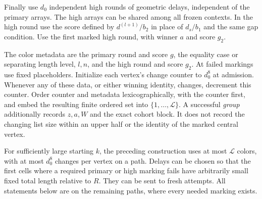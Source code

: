 Finally use $d_0$ independent high rounds of geometric delays, independent
of the primary arrays.  The high arrays can be shared among all frozen
contexts.  In the high round use the score defined by
$d^{(l+1)}/b_2$ in place of $d_s/b_1$ and the same gap condition.
Use the first marked high round, with winner $a$ and score $g_2$.

The color metadata are the primary round and score $g$, the equality
case or separating length level, $l,n$, and the high round and score
$g_2$.  At failed markings use fixed placeholders.  Initialize each vertex's change counter to $d_0^8$ at admission.
Whenever any of these data, or either winning identity, changes,
decrement this counter.  Order counter and metadata
lexicographically, with the counter first, and embed the resulting
finite ordered set into $\{1,\ldots,\mathcal L\}$.  A successful
\emph{group} additionally records $z,a,W$ and the exact cohort block.
It does not record the changing list size within an upper half or the
identity of the marked central vertex.

\begin{lemma}
\label{lem:color-budget}
For sufficiently large starting $k$, the preceding construction uses at
most $\mathcal L$ colors, with at most $d_0^8$ changes per vertex on a
path.  Delays can be chosen so that the first cells where a required
primary or high marking fails have arbitrarily small fixed total length
relative to $R$.  They can be sent to fresh attempts.  All statements
below are on the remaining paths, where every needed marking exists.
\end{lemma}


